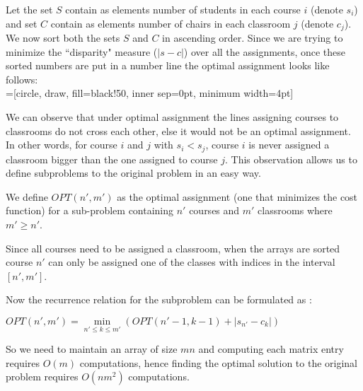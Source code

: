 Let the set $S$ contain as elements number of students in each course $i$ (denote $s_i$) and set $C$ contain as elements number of chairs in each classroom $j$ (denote $c_j$). We now sort both the sets $S$ and $C$ in ascending order. Since we are trying to minimize the ``disparity" measure ($|s - c|$) over all the assignments, once these sorted numbers are put in a number line the optimal assignment looks like follows: \\



=[circle, draw, fill=black!50,
                        inner sep=0pt, minimum width=4pt]
\quad



We can observe that under optimal assignment the lines assigning courses to classrooms do not cross each other, else it would not be an optimal assignment. In other words, for course $i$ and $j$ with $s_i < s_j$, course $i$ is never assigned a classroom bigger than the one assigned to course $j$. This observation allows us to define subproblems to the original problem in an easy way.

We define $OPT(n', m')$ as the optimal assignment (one that minimizes the cost function) for a sub-problem containing $n'$ courses and $m'$ classrooms where $m' \geq n'$.



Since all courses need to be assigned a classroom, when the arrays are sorted course $n'$ can only be assigned one of the classes with indices in the interval $[n', m']$.

Now the recurrence relation for the subproblem can be formulated as :

\begin{center}
	$OPT(n', m') = \min\limits_{n'\leq k \leq m'} (OPT(n'-1, k-1) + |s_{n'} - c_{k}|)$
\end{center}

So we need to maintain an array of size $mn$ and computing each matrix entry requires $O(m)$ computations, hence finding the optimal solution to the original problem requires $O(nm^2)$ computations.

